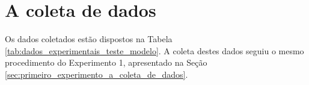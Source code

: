 \section{A coleta de dados}
\label{sec:segundo_experimento_a_coleta_de_dados}

Os dados coletados estão dispostos na Tabela \ref{tab:dados_experimentais_teste_modelo}. A coleta destes dados seguiu o mesmo procedimento do Experimento 1, apresentado na Seção \ref{sec:primeiro_experimento_a_coleta_de_dados}.

